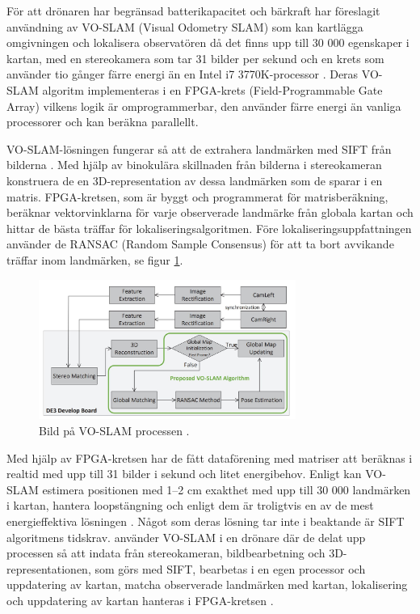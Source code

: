 För att drönaren har begränsad batterikapacitet och bärkraft har \cite{voslam} föreslagit användning av VO-SLAM (Visual Odometry SLAM) som kan kartlägga omgivningen och lokalisera observatören då det finns upp till 30 000 egenskaper i kartan, med en stereokamera som tar 31 bilder per sekund och en krets som använder tio gånger färre energi än en Intel i7 3770K-processor \citep{voslam}. Deras VO-SLAM algoritm implementeras i en FPGA-krets (Field-Programmable Gate Array) vilkens logik är omprogrammerbar, den använder färre energi än vanliga processorer och kan beräkna parallellt. 

VO-SLAM-lösningen fungerar så att de extrahera landmärken med SIFT från bilderna \citep{voslam}. Med hjälp av binokulära skillnaden från bilderna i stereokameran konstruera de en 3D-representation av dessa landmärken som de sparar i en matris. FPGA-kretsen, som är byggt och programmerat för matrisberäkning, beräknar vektorvinklarna för varje observerade landmärke från globala kartan och hittar de bästa träffar för lokaliseringsalgoritmen. Före lokaliseringsuppfattningen använder de RANSAC (Random Sample Consensus) för att ta bort avvikande träffar inom landmärken, se figur \ref{voslamprocess}. 

\begin{figure}[ht]
    \begin{center}
    \includegraphics[width=0.75\textwidth]{voslam.JPG}
    \caption{Bild på VO-SLAM processen \citep{voslam}.}
    \label{voslamprocess}
    \end{center}
\end{figure}

Med hjälp av FPGA-kretsen har de fått dataförening med matriser att beräknas i realtid med upp till 31 bilder i sekund och litet energibehov. Enligt \cite{voslam} kan VO-SLAM estimera positionen med 1–2 cm exakthet med upp till 30 000 landmärken i kartan, hantera loopstängning och enligt dem är troligtvis en av de mest energieffektiva lösningen \citep{voslam}. Något som deras lösning tar inte i beaktande är SIFT algoritmens tidskrav. \cite{voslamlatif} använder VO-SLAM i en drönare där de delat upp processen så att indata från stereokameran, bildbearbetning och 3D-representationen, som görs med SIFT, bearbetas i en egen processor och uppdatering av kartan, matcha observerade landmärken med kartan, lokalisering och uppdatering av kartan hanteras i FPGA-kretsen \citep{voslamlatif}. 

